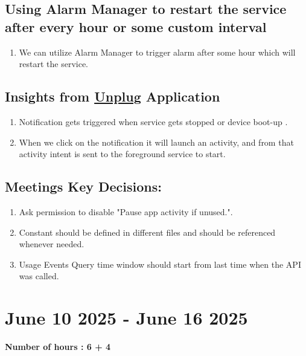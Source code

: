 \documentclass[12pt]{article}
\begin{document}
    \subsection{Using Alarm Manager to restart the service after every hour or some custom interval}
    \begin{enumerate}
        \item We can utilize Alarm Manager to trigger alarm after some hour which will restart the service.
    \end{enumerate}
    \subsection{Insights from \href{https://play.google.com/store/apps/details?id=com.unpluq.beta&hl=en_IN}{Unplug} Application}
        
    \begin{enumerate}
        \item Notification gets triggered when service gets stopped or device boot-up .
        \item When we click on the notification it will launch an activity, and from that activity intent is sent to the foreground service to start.
    \end{enumerate}
    \subsection{Meetings Key Decisions: }
    \begin{enumerate}
        \item Ask permission to disable "Pause app activity if unused.".
        \item Constant should be defined in different files and should be referenced  whenever needed.
        \item Usage Events Query time window should start from last time when the API was called.
    \end{enumerate}
    \section{June 10 2025 - June 16 2025}
    {\bf Number of hours : 6 + 4 }
\end{document}
